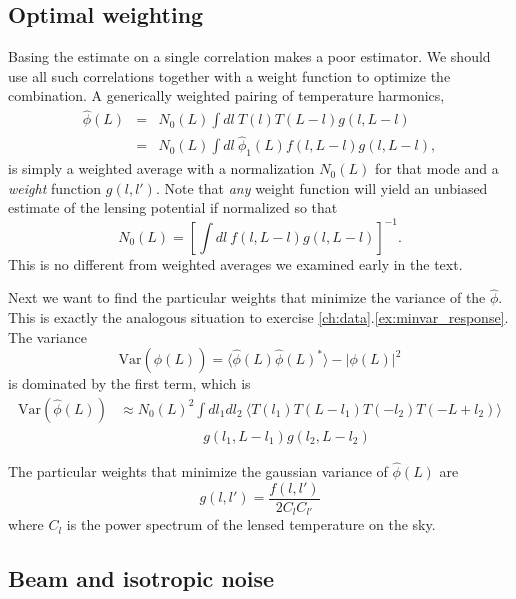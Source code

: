 \citep{2011JCAP...03..018L}

\subsection{Optimal weighting}


Basing the estimate on a single correlation makes a poor estimator.  We should use all such correlations together with a weight function to optimize the combination.  A generically weighted pairing of temperature harmonics, 
\begin{eqnarray}
  \hat\phi(L) &=& N_0(L) \int dl\  T(l) T(L-l) g(l,L-l)  \label{eq:quadratic_est} \\ \nonumber
  &=& N_0(L) \int dl\  \hat\phi_{1}(L) f(l,L-l)  g(l,L-l),
\end{eqnarray}
is simply a weighted average with a normalization $N_0(L)$ for that mode and a \textit{weight} function $g(l,l')$.  Note that \textit{any} weight function will yield an unbiased estimate of the lensing potential if normalized so that
\begin{equation}
   N_0(L) = \left[  \int dl\  f(l,L-l) g(l,L-l)   \right]^{-1}.
\end{equation}
This is no different from weighted averages we examined early in the text.

Next we want to find the particular weights that minimize the variance of the $\hat \phi$.  This is exactly the analogous situation to exercise \ref{ch:data}.\ref{ex:minvar_response}.  The variance
\begin{equation}
  \mathrm{Var}(\hat\phi(L)) = \langle \hat\phi(L) \hat\phi(L)^* \rangle - |\phi(L)|^2
\end{equation}
is dominated by the first term, which is
\begin{align} \label{eq:lensingvariance}
  \mathrm{Var}(\hat\phi(L)) 
 &\approx N_0(L)^2 \int dl_1 dl_2\ \langle T(l_1) T(L-l_1) T(-l_2) T(-L+l_2) \rangle \\ \nonumber
  & \qquad \qquad \qquad g(l_1,L-l_1) g(l_2,L-l_2)
\end{align}

The particular weights that minimize the gaussian variance of $\hat\phi(L)$ are
\begin{equation}
  g(l,l') = \frac{f(l,l')}{2 C_l C_{l'}}
\end{equation}
where  $C_l$ is the power spectrum of the lensed temperature on the sky.


\subsection{Beam and isotropic noise}


